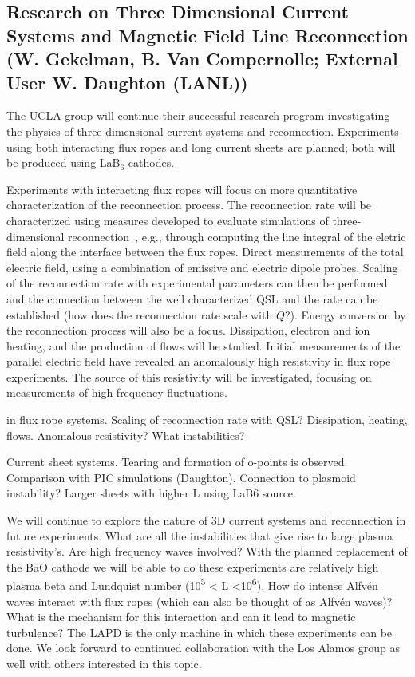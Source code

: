 \documentclass[11pt]{article}
\renewcommand{\cite}{\citep}
\begin{document}
\subsection{Research on Three Dimensional Current Systems and Magnetic Field
Line Reconnection (W. Gekelman, B. Van Compernolle; External User
W. Daughton (LANL))}

The UCLA group will continue their successful
research program investigating the physics of three-dimensional
current systems and reconnection.  Experiments using both interacting
flux ropes and long current sheets are planned; both will be produced
using LaB$_6$ cathodes.  

Experiments with interacting flux ropes will focus on more
quantitative characterization of the reconnection process.  The
reconnection rate will be characterized using measures developed to
evaluate simulations of three-dimensional
reconnection~\cite{finn:2014,daughton:2014}, e.g., through computing
the line integral of the eletric field along the interface between the
flux ropes. Direct measurements of the total electric field, using a
combination of emissive and electric dipole probes.  Scaling of the
reconnection rate with experimental parameters can then be performed
and the connection between the well characterized QSL and the rate can
be established (how does the reconnection rate scale with $Q$?).
Energy conversion by the reconnection process will also be a focus.
Dissipation, electron and ion heating, and the production of flows
will be studied.  Initial measurements of the parallel electric field
have revealed an anomalously high resistivity in flux rope
experiments.  The source of this resistivity will be investigated,
focusing on measurements of high frequency fluctuations.
 

in flux rope systems.
Scaling of reconnection rate with QSL?  Dissipation, heating, flows.
Anomalous resistivity?  What instabilities?

Current sheet systems.  Tearing and formation of o-points is
observed.  Comparison with PIC simulations (Daughton).  Connection to
plasmoid instability?  Larger sheets with higher L using LaB6 source. 


We will continue to explore the nature of
3D current systems and reconnection in future experiments. What are
all the instabilities that give rise to large plasma
resistivity's. Are high frequency waves involved? With the planned
replacement of the BaO cathode we will be able to do these experiments
are relatively high plasma beta and Lundquist number
(10\textsuperscript{5} \textless{} L
\textless{}10\textsuperscript{6}).  How do intense Alfvén waves
interact with flux ropes (which can also be thought of as Alfvén
waves)? What is the mechanism for this interaction and can it lead to
magnetic turbulence? The LAPD is the only machine in which these
experiments can be done. We look forward to continued collaboration
with the Los Alamos group as well with others interested in this
topic.
\end{document}

